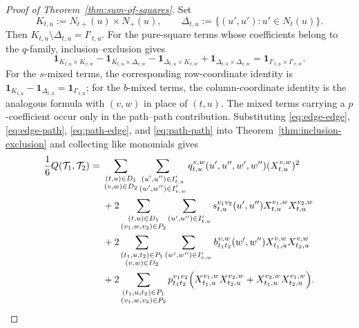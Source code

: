 \documentclass[12pt]{article}
\begin{document}
\begin{proof}[Proof of Theorem~\ref{thm:sum-of-squares}]
Set
\begin{equation}\label{eq:display-043}
K_{t,u}:=N_{t+}(u)\times N_+(u),
\qquad
\Delta_{t,u}:=\{(u',u'):u'\in N_t(u)\}.
\end{equation}
Then $K_{t,u}\setminus\Delta_{t,u}=I'_{t,u}$.  For the pure-square terms
whose coefficients belong to the $q$-family, inclusion--exclusion gives
\begin{equation}\label{eq:display-044}
\mathbf 1_{K_{t,u}\times K_{v,w}}
-\mathbf 1_{K_{t,u}\times\Delta_{v,w}}
-\mathbf 1_{\Delta_{t,u}\times K_{v,w}}
+\mathbf 1_{\Delta_{t,u}\times\Delta_{v,w}}
=\mathbf 1_{I'_{t,u}\times I'_{v,w}}.
\end{equation}
For the $s$-mixed terms, the corresponding row-coordinate identity is
$\mathbf 1_{K_{t,u}}-\mathbf 1_{\Delta_{t,u}}=\mathbf 1_{I'_{t,u}}$; for
the $b$-mixed terms, the column-coordinate identity is the analogous formula
with $(v,w)$ in place of $(t,u)$.  The mixed terms carrying a
$p$-coefficient occur only in the path--path contribution.  Substituting
\eqref{eq:edge-edge},
\eqref{eq:edge-path}, \eqref{eq:path-edge}, and \eqref{eq:path-path} into
Theorem~\ref{thm:inclusion-exclusion} and collecting like monomials gives
\begin{align}
\frac16Q(\mathcal T_1,\mathcal T_2)
={}&\sum_{\substack{(t,u)\in D_1\\(v,w)\in D_2}}
\sum_{\substack{(u',u'')\in I'_{t,u}\\(w',w'')\in I'_{v,w}}}
q_{t,u}^{v,w}(u',u'',w',w'')(X_{t,u}^{v,w})^2                 \notag\\
&+2\sum_{\substack{(t,u)\in D_1\\(v_1,w,v_2)\in P_2}}
\sum_{(u',u'')\in I'_{t,u}}
s_{t,u}^{v_1v_2}(u',u'')X_{t,u}^{v_1,w}X_{t,u}^{v_2,w}        \notag\\
&+2\sum_{\substack{(t_1,u,t_2)\in P_1\\(v,w)\in D_2}}
\sum_{(w',w'')\in I'_{v,w}}
b_{t_1t_2}^{v,w}(w',w'')X_{t_1,u}^{v,w}X_{t_2,u}^{v,w}        \notag\\
&+2\sum_{\substack{(t_1,u,t_2)\in P_1\\(v_1,w,v_2)\in P_2}}
p_{t_1t_2}^{v_1v_2}
\Bigl(X_{t_1,u}^{v_1,w}X_{t_2,u}^{v_2,w}
+X_{t_1,u}^{v_2,w}X_{t_2,u}^{v_1,w}\Bigr).            \label{eq:raw-quadratic}
\end{align}


\end{proof}
\end{document}
